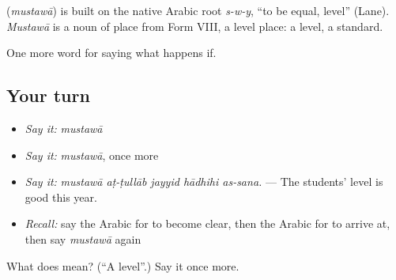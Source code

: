 \begin{cousinweb}
\textbf{} (\emph{mustawā}) is built on the native Arabic root \emph{s-w-y}, \textquotedblleft{}to be equal, level\textquotedblright{} (Lane). \emph{Mustawā} is a noun of place from Form VIII, a level place: a level, a standard.
\end{cousinweb}

\begin{grammarlens}[title={What you've built}]
One more word for saying what happens if.
\end{grammarlens}

\subsection*{Your turn}
\begin{itemize}
\raggedright
  \item \emph{Say it:} \emph{mustawā}
  \item \emph{Say it:} \emph{mustawā}, once more
  \item \emph{Say it:} \emph{mustawā aṭ-ṭullāb jayyid hādhihi as-sana.} — The students' level is good this year.
  \item \emph{Recall:} say the Arabic for to become clear, then the Arabic for to arrive at, then say \emph{mustawā} again
\end{itemize}

\begin{tcolorbox}[breakable,colback=teal!4,colframe=teal!35!black,title={Before you move on}]
What does  mean? (\textquotedblleft{}A level\textquotedblright{}.) Say it once more.
\end{tcolorbox}
